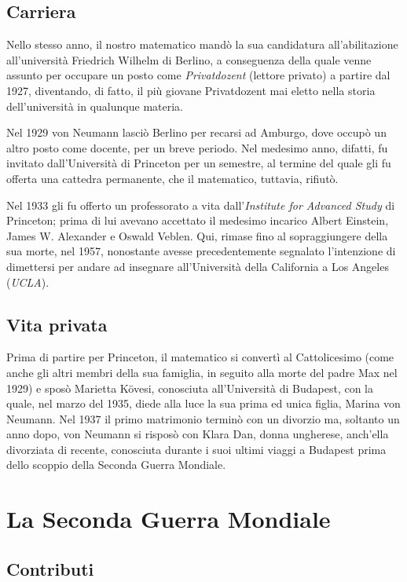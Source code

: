 \documentclass[a4paper, 12pt]{article}
\begin{document}
\subsection{Carriera}

Nello stesso anno, il nostro matematico mandò la sua candidatura all'abilitazione all'università Friedrich Wilhelm di Berlino, a conseguenza della quale venne assunto per occupare un posto come \textit{Privatdozent} (lettore privato) a partire dal 1927, diventando, di fatto, il più giovane Privatdozent mai eletto nella storia dell'università in qualunque materia. 

Nel 1929 von Neumann lasciò Berlino per recarsi ad Amburgo, dove occupò un altro posto come docente, per un breve periodo. Nel medesimo anno, difatti, fu invitato dall'Università di Princeton per un semestre, al termine del quale gli fu offerta una cattedra permanente, che il matematico, tuttavia, rifiutò.

Nel 1933 gli fu offerto un professorato a vita dall'\textit{Institute for Advanced Study} di Princeton; prima di lui avevano accettato il medesimo incarico Albert Einstein, James W. Alexander e Oswald Veblen. Qui, rimase fino al sopraggiungere della sua morte, nel 1957, nonostante avesse precedentemente segnalato l'intenzione di dimettersi per andare ad insegnare all'Università della California a Los Angeles (\textit{UCLA}).

\subsection{Vita privata}

 Prima di partire per Princeton, il matematico si convertì al Cattolicesimo (come anche gli altri membri della sua famiglia, in seguito alla morte del padre Max nel 1929) e sposò Marietta Kövesi, conosciuta all'Università di Budapest, con la quale, nel marzo del 1935, diede alla luce la sua prima ed unica figlia, Marina von Neumann. Nel 1937 il primo matrimonio terminò con un divorzio ma, soltanto un anno dopo, von Neumann si risposò con Klara Dan, donna ungherese, anch'ella divorziata di recente, conosciuta durante i suoi ultimi viaggi a Budapest prima dello scoppio della Seconda Guerra Mondiale.

\section{La Seconda Guerra Mondiale}

\subsection{Contributi}
\end{document}

